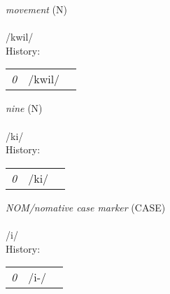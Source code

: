\vspace{15pt}
\begin{nopagebreak}
 \textit{movement} (N)\\
\\
\noindent /kw{\textprimstress}il/\\


\noindent History:

\vspace{-0pt}
\hspace{40pt}
\begin{tabular}{ccc}
\textit{0} & /kwil/& \\
\end{tabular}

\vspace{20pt}\hline

\end{nopagebreak}
\filbreak



\vspace{15pt}
\begin{nopagebreak}
 \textit{nine} (N)\\
\\
\noindent /k{\textprimstress}i/\\


\noindent History:

\vspace{-0pt}
\hspace{40pt}
\begin{tabular}{ccc}
\textit{0} & /ki/& \\
\end{tabular}

\vspace{20pt}\hline

\end{nopagebreak}
\filbreak



\vspace{15pt}
\begin{nopagebreak}
 \textit{NOM/nomative case marker} (CASE)\\
\\
\noindent /{\textprimstress}i/\\


\noindent History:

\vspace{-0pt}
\hspace{40pt}
\begin{tabular}{ccc}
\textit{0} & /i-/& \\
\end{tabular}

\vspace{20pt}\hline

\end{nopagebreak}
\filbreak



